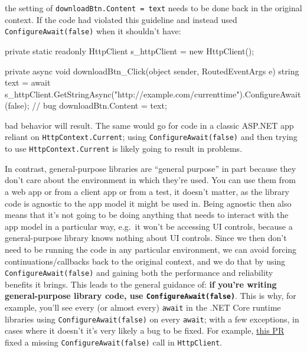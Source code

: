 \documentclass[a4paper,12pt,notitlepage,twoside,openright]{article}
\begin{document}
the setting of \texttt{downloadBtn.Content\ =\ text} needs to be done
back in the original context. If the code had violated this guideline
and instead used \texttt{ConfigureAwait(false)} when it shouldn't have:

\begin{csharpcode}
private static readonly HttpClient s_httpClient = new HttpClient();

private async void downloadBtn_Click(object sender, RoutedEventArgs e)
{
    string text = await s_httpClient.GetStringAsync("http://example.com/currenttime").ConfigureAwait(false); // bug
    downloadBtn.Content = text;
}
\end{csharpcode}

bad behavior will result. The same would go for code in a classic
ASP.NET app reliant on \texttt{HttpContext.Current}; using
\texttt{ConfigureAwait(false)} and then trying to use
\texttt{HttpContext.Current} is likely going to result in problems.

In contrast, general-purpose libraries are ``general purpose'' in part
because they don't care about the environment in which they're used. You
can use them from a web app or from a client app or from a test, it
doesn't matter, as the library code is agnostic to the app model it
might be used in. Being agnostic then also means that it's not going to
be doing anything that needs to interact with the app model in a
particular way, e.g.~it won't be accessing UI controls, because a
general-purpose library knows nothing about UI controls. Since we then
don't need to be running the code in any particular environment, we can
avoid forcing continuations/callbacks back to the original context, and
we do that by using \texttt{ConfigureAwait(false)} and gaining both the
performance and reliability benefits it brings. This leads to the
general guidance of: \textbf{if you're writing general-purpose library
code, use \texttt{ConfigureAwait(false)}}. This is why, for example,
you'll see every (or almost every) \texttt{await} in the .NET Core
runtime libraries using \texttt{ConfigureAwait(false)} on every
\texttt{await}; with a few exceptions, in cases where it doesn't it's
very likely a bug to be fixed. For example,
\href{https://github.com/dotnet/corefx/pull/38610}{this PR} fixed a
missing \texttt{ConfigureAwait(false)} call in \texttt{HttpClient}.
\end{document}
